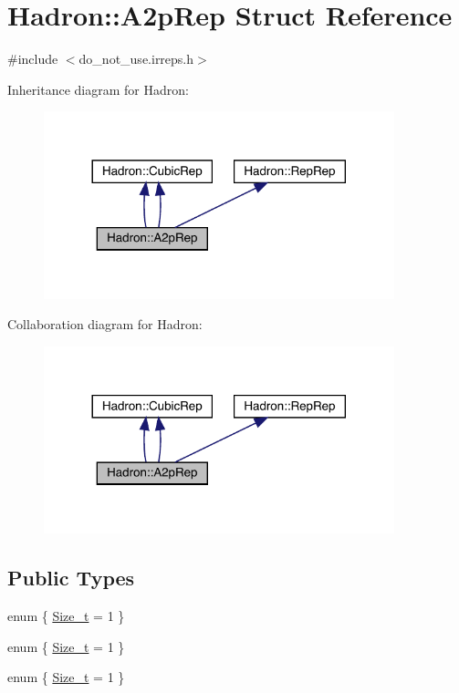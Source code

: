 \hypertarget{structHadron_1_1A2pRep}{}\section{Hadron\+:\+:A2p\+Rep Struct Reference}
\label{structHadron_1_1A2pRep}


{\ttfamily \#include $<$do\+\_\+not\+\_\+use.\+irreps.\+h$>$}



Inheritance diagram for Hadron\+:\nopagebreak
\begin{figure}[H]
\begin{center}
\leavevmode
\includegraphics[width=288pt]{dc/de5/structHadron_1_1A2pRep__inherit__graph}
\end{center}
\end{figure}


Collaboration diagram for Hadron\+:\nopagebreak
\begin{figure}[H]
\begin{center}
\leavevmode
\includegraphics[width=288pt]{db/d64/structHadron_1_1A2pRep__coll__graph}
\end{center}
\end{figure}
\subsection*{Public Types}
\begin{DoxyCompactItemize}
\item 
enum \{ \mbox{\hyperlink{structHadron_1_1A2pRep_a1ae4e9923ef6202e0e822a5d6801630aa2d30d4dda9e31e92800d0753a2d9514a}{Size\+\_\+t}} = 1
 \}
\item 
enum \{ \mbox{\hyperlink{structHadron_1_1A2pRep_a1ae4e9923ef6202e0e822a5d6801630aa2d30d4dda9e31e92800d0753a2d9514a}{Size\+\_\+t}} = 1
 \}
\item 
enum \{ \mbox{\hyperlink{structHadron_1_1A2pRep_a1ae4e9923ef6202e0e822a5d6801630aa2d30d4dda9e31e92800d0753a2d9514a}{Size\+\_\+t}} = 1
 \}
\end{DoxyCompactItemize}
